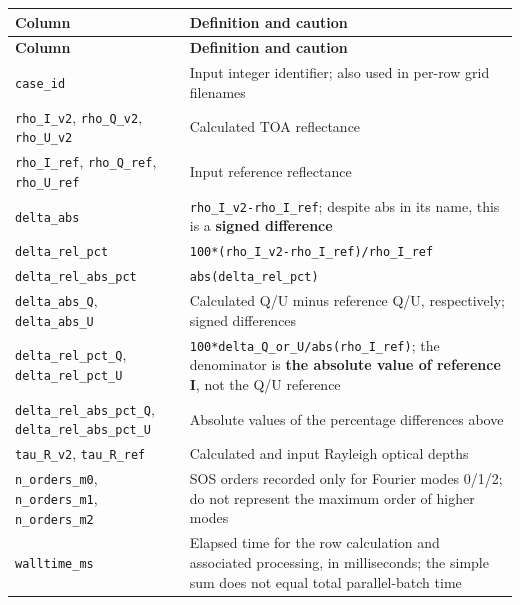 {\TableFont
\begin{longtable}{@{}>{\raggedright\arraybackslash}p{}>{\raggedright\arraybackslash}p{}@{}}
\toprule
\textbf{Column} & \textbf{Definition and caution} \\
\midrule
\endfirsthead
\toprule
\textbf{Column} & \textbf{Definition and caution} \\
\midrule
\endhead
\bottomrule
\endfoot
\texttt{case\_\allowbreak{}id} & Input integer identifier; also used in per-row grid filenames \\
\texttt{rho\_\allowbreak{}I\_\allowbreak{}v2}, \texttt{rho\_\allowbreak{}Q\_\allowbreak{}v2}, \texttt{rho\_\allowbreak{}U\_\allowbreak{}v2} & Calculated TOA reflectance \\
\texttt{rho\_\allowbreak{}I\_\allowbreak{}ref}, \texttt{rho\_\allowbreak{}Q\_\allowbreak{}ref}, \texttt{rho\_\allowbreak{}U\_\allowbreak{}ref} & Input reference reflectance \\
\texttt{delta\_\allowbreak{}abs} & \texttt{rho\_\allowbreak{}I\_\allowbreak{}v2-rho\_\allowbreak{}I\_\allowbreak{}ref}; despite abs in its name, this is a \textbf{signed difference} \\
\texttt{delta\_\allowbreak{}rel\_\allowbreak{}pct} & \texttt{100*(rho\_\allowbreak{}I\_\allowbreak{}v2-rho\_\allowbreak{}I\_\allowbreak{}ref)/\allowbreak{}rho\_\allowbreak{}I\_\allowbreak{}ref} \\
\texttt{delta\_\allowbreak{}rel\_\allowbreak{}abs\_\allowbreak{}pct} & \texttt{abs(delta\_\allowbreak{}rel\_\allowbreak{}pct)} \\
\texttt{delta\_\allowbreak{}abs\_\allowbreak{}Q}, \texttt{delta\_\allowbreak{}abs\_\allowbreak{}U} & Calculated Q/U minus reference Q/U, respectively; signed differences \\
\texttt{delta\_\allowbreak{}rel\_\allowbreak{}pct\_\allowbreak{}Q}, \texttt{delta\_\allowbreak{}rel\_\allowbreak{}pct\_\allowbreak{}U} & \texttt{100*delta\_\allowbreak{}Q\_\allowbreak{}or\_\allowbreak{}U/\allowbreak{}abs(rho\_\allowbreak{}I\_\allowbreak{}ref)}; the denominator is \textbf{the absolute value of reference I}, not the Q/U reference \\
\texttt{delta\_\allowbreak{}rel\_\allowbreak{}abs\_\allowbreak{}pct\_\allowbreak{}Q}, \texttt{delta\_\allowbreak{}rel\_\allowbreak{}abs\_\allowbreak{}pct\_\allowbreak{}U} & Absolute values of the percentage differences above \\
\texttt{tau\_\allowbreak{}R\_\allowbreak{}v2}, \texttt{tau\_\allowbreak{}R\_\allowbreak{}ref} & Calculated and input Rayleigh optical depths \\
\texttt{n\_\allowbreak{}orders\_\allowbreak{}m0}, \texttt{n\_\allowbreak{}orders\_\allowbreak{}m1}, \texttt{n\_\allowbreak{}orders\_\allowbreak{}m2} & SOS orders recorded only for Fourier modes 0/1/2; do not represent the maximum order of higher modes \\
\texttt{walltime\_\allowbreak{}ms} & Elapsed time for the row calculation and associated processing, in milliseconds; the simple sum does not equal total parallel-batch time \\
\end{longtable}
}

